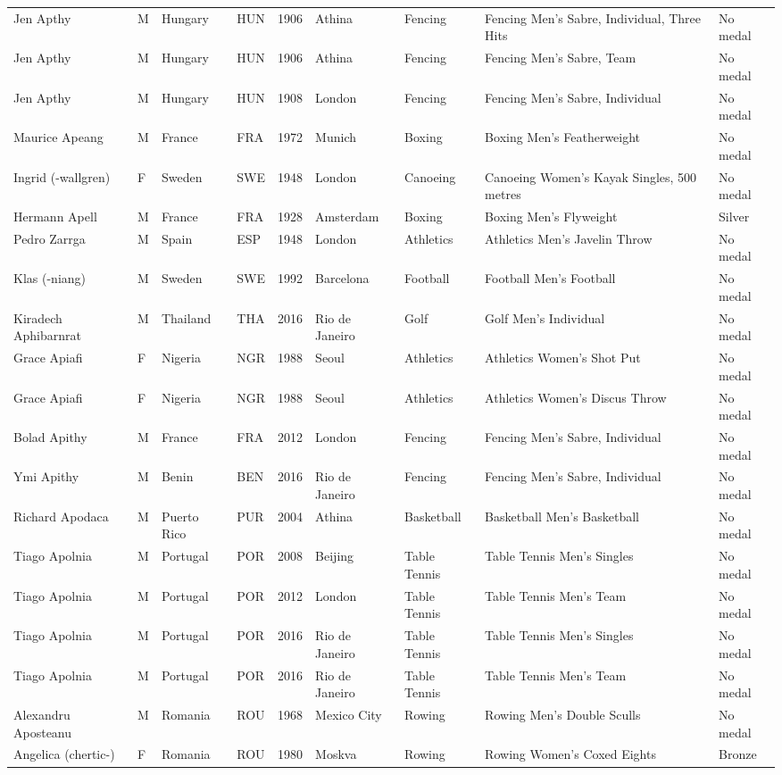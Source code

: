 \documentclass{article}%
\begin{document}
\begin{longtable}{l l l l l l l l l}
Jen Apthy&M&Hungary&HUN&1906&Athina&Fencing&Fencing Men's Sabre, Individual, Three Hits&No medal\\%
Jen Apthy&M&Hungary&HUN&1906&Athina&Fencing&Fencing Men's Sabre, Team&No medal\\%
Jen Apthy&M&Hungary&HUN&1908&London&Fencing&Fencing Men's Sabre, Individual&No medal\\%
Maurice Apeang&M&France&FRA&1972&Munich&Boxing&Boxing Men's Featherweight&No medal\\%
Ingrid ({-}wallgren)&F&Sweden&SWE&1948&London&Canoeing&Canoeing Women's Kayak Singles, 500 metres&No medal\\%
Hermann Apell&M&France&FRA&1928&Amsterdam&Boxing&Boxing Men's Flyweight&Silver\\%
Pedro Zarrga&M&Spain&ESP&1948&London&Athletics&Athletics Men's Javelin Throw&No medal\\%
Klas ({-}niang)&M&Sweden&SWE&1992&Barcelona&Football&Football Men's Football&No medal\\%
Kiradech Aphibarnrat&M&Thailand&THA&2016&Rio de Janeiro&Golf&Golf Men's Individual&No medal\\%
Grace Apiafi&F&Nigeria&NGR&1988&Seoul&Athletics&Athletics Women's Shot Put&No medal\\%
Grace Apiafi&F&Nigeria&NGR&1988&Seoul&Athletics&Athletics Women's Discus Throw&No medal\\%
Bolad Apithy&M&France&FRA&2012&London&Fencing&Fencing Men's Sabre, Individual&No medal\\%
Ymi Apithy&M&Benin&BEN&2016&Rio de Janeiro&Fencing&Fencing Men's Sabre, Individual&No medal\\%
Richard Apodaca&M&Puerto Rico&PUR&2004&Athina&Basketball&Basketball Men's Basketball&No medal\\%
Tiago Apolnia&M&Portugal&POR&2008&Beijing&Table Tennis&Table Tennis Men's Singles&No medal\\%
Tiago Apolnia&M&Portugal&POR&2012&London&Table Tennis&Table Tennis Men's Team&No medal\\%
Tiago Apolnia&M&Portugal&POR&2016&Rio de Janeiro&Table Tennis&Table Tennis Men's Singles&No medal\\%
Tiago Apolnia&M&Portugal&POR&2016&Rio de Janeiro&Table Tennis&Table Tennis Men's Team&No medal\\%
Alexandru Aposteanu&M&Romania&ROU&1968&Mexico City&Rowing&Rowing Men's Double Sculls&No medal\\%
Angelica (chertic{-})&F&Romania&ROU&1980&Moskva&Rowing&Rowing Women's Coxed Eights&Bronze\\%

\end{longtable}
\end{document}
